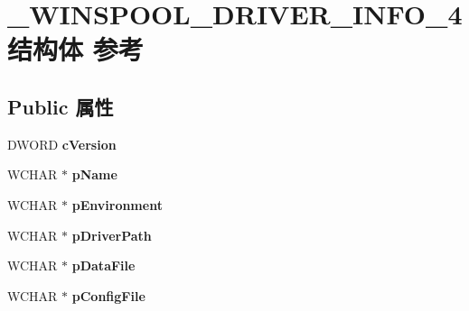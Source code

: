 \hypertarget{struct___w_i_n_s_p_o_o_l___d_r_i_v_e_r___i_n_f_o__4}{}\section{\+\_\+\+W\+I\+N\+S\+P\+O\+O\+L\+\_\+\+D\+R\+I\+V\+E\+R\+\_\+\+I\+N\+F\+O\+\_\+4结构体 参考}
\label{struct___w_i_n_s_p_o_o_l___d_r_i_v_e_r___i_n_f_o__4}
\subsection*{Public 属性}
\begin{DoxyCompactItemize}
\item 
\mbox{\label{struct___w_i_n_s_p_o_o_l___d_r_i_v_e_r___i_n_f_o__4_af544d4aa796464256920e7ac91baf327}} 
D\+W\+O\+RD {\bfseries c\+Version}
\item 
\mbox{\label{struct___w_i_n_s_p_o_o_l___d_r_i_v_e_r___i_n_f_o__4_af03528250851df016d6e8e6b2ae8faf3}} 
W\+C\+H\+AR $\ast$ {\bfseries p\+Name}
\item 
\mbox{\label{struct___w_i_n_s_p_o_o_l___d_r_i_v_e_r___i_n_f_o__4_ad1b3369832d630859d4ff1846e574e07}} 
W\+C\+H\+AR $\ast$ {\bfseries p\+Environment}
\item 
\mbox{\label{struct___w_i_n_s_p_o_o_l___d_r_i_v_e_r___i_n_f_o__4_a27490b2864256dcfa6310d449fa100d7}} 
W\+C\+H\+AR $\ast$ {\bfseries p\+Driver\+Path}
\item 
\mbox{\label{struct___w_i_n_s_p_o_o_l___d_r_i_v_e_r___i_n_f_o__4_a7cb3db309f654731646fdd626b50d191}} 
W\+C\+H\+AR $\ast$ {\bfseries p\+Data\+File}
\item 
\mbox{\label{struct___w_i_n_s_p_o_o_l___d_r_i_v_e_r___i_n_f_o__4_ab86e913ea8f413a1a5dd3567856bd776}} 
W\+C\+H\+AR $\ast$ {\bfseries p\+Config\+File}
\item 

\end{DoxyCompactItemize}
